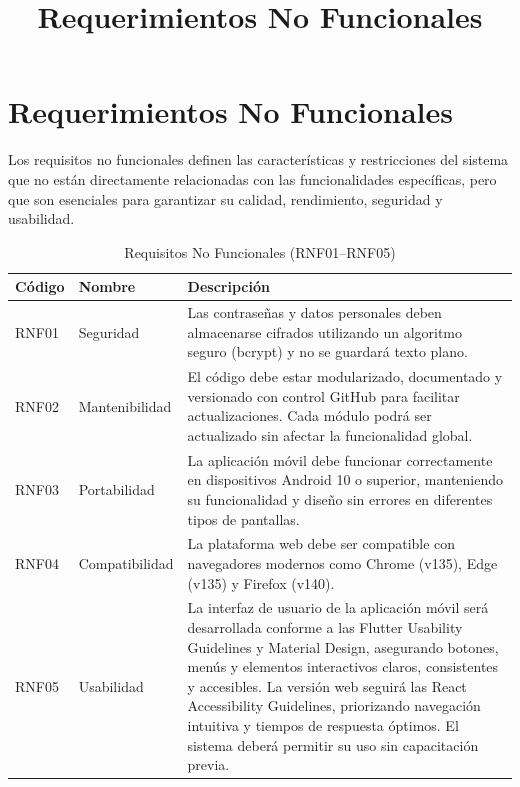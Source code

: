 \documentclass[12pt,a4paper]{article}
\title{Requerimientos No Funcionales}
\author{}
\date{}
\begin{document}
\maketitle

\section{Requerimientos No Funcionales}

Los requisitos no funcionales definen las características y restricciones del sistema que no están directamente relacionadas con las funcionalidades específicas, pero que son esenciales para garantizar su calidad, rendimiento, seguridad y usabilidad.

\begin{table}[H]
\centering
\renewcommand{\arraystretch}{1.2}
\begin{tabularx}{\textwidth}{l l X}
\toprule
\textbf{Código} & \textbf{Nombre} & \textbf{Descripción} \\
\midrule

RNF01 & Seguridad &
Las contraseñas y datos personales deben almacenarse cifrados utilizando un algoritmo seguro (bcrypt) y no se guardará texto plano. \\

RNF02 & Mantenibilidad &
El código debe estar modularizado, documentado y versionado con control GitHub para facilitar actualizaciones. Cada módulo podrá ser actualizado sin afectar la funcionalidad global. \\

RNF03 & Portabilidad &
La aplicación móvil debe funcionar correctamente en dispositivos Android 10 o superior, manteniendo su funcionalidad y diseño sin errores en diferentes tipos de pantallas. \\

RNF04 & Compatibilidad &
La plataforma web debe ser compatible con navegadores modernos como Chrome (v135), Edge (v135) y Firefox (v140). \\

RNF05 & Usabilidad &
La interfaz de usuario de la aplicación móvil será desarrollada conforme a las Flutter Usability Guidelines y Material Design, asegurando botones, menús y elementos interactivos claros, consistentes y accesibles. La versión web seguirá las React Accessibility Guidelines, priorizando navegación intuitiva y tiempos de respuesta óptimos. El sistema deberá permitir su uso sin capacitación previa. \\

\bottomrule
\end{tabularx}
\caption{Requisitos No Funcionales (RNF01–RNF05)}
\end{table}
\end{document}
